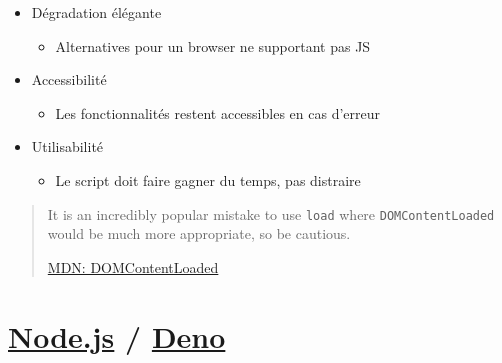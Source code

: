 \begin{itemize}
\tightlist
\item
  Dégradation élégante

  \begin{itemize}
  \tightlist
  \item
    Alternatives pour un browser ne supportant pas JS
  \end{itemize}
\item
  Accessibilité

  \begin{itemize}
  \tightlist
  \item
    Les fonctionnalités restent accessibles en cas d'erreur
  \end{itemize}
\item
  Utilisabilité

  \begin{itemize}
  \tightlist
  \item
    Le script doit faire gagner du temps, pas distraire
  \end{itemize}
\end{itemize}

\begin{quote}
It is an incredibly popular mistake to use \textenglish{\texttt{load}}
where \textenglish{\texttt{DOMContentLoaded}} would be much more
appropriate, so be cautious.

\href{https://developer.mozilla.org/en/docs/Web/Events/DOMContentLoaded}{MDN:
DOMContentLoaded}
\end{quote}

\hypertarget{node.js-deno}{%
\section{\texorpdfstring{\href{https://nodejs.org}{Node.js} /
\href{https://www.reddit.com/r/node/comments/nx9qqr/deno_vs_nodejs_a_comparison_you_need_to_know/}{Deno}}{Node.js / Deno}}\label{node.js-deno}}

